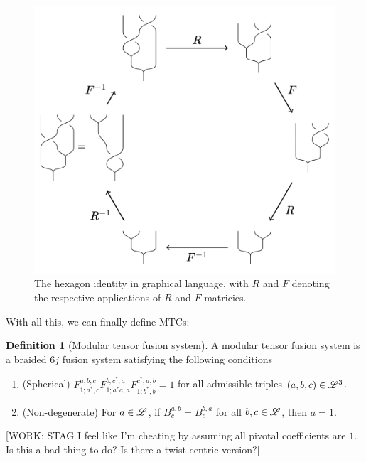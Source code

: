 \documentclass{article}
\theoremstyle{definition}
\newtheorem*{definition}{Definition}
\numberwithin{figure}{section}
\begin{document}
\begin{figure}
\begin{center}
\includegraphics[scale=0.25]{hexagon}
\caption{ The hexagon identity in graphical language, with $R$ and $F$ denoting the respective applications of $R$ and $F$ matricies.}
\label{fig:hexagon}
\end{center}
\end{figure}

With all this, we can finally define MTCs:

\begin{definition}[Modular tensor fusion system] A modular tensor fusion system is a braided $6j$ fusion system satisfying the following conditions

\begin{enumerate}

\item (Spherical) $F^{a,b,c}_{1;a^*,c}F^{b,c^*,a}_{1;a^*a,a}F^{c^*,a,b}_{1;b^*,b}=1$ for all admissible triples $(a,b,c)\in \mathscr{L}^3$.

\item (Non-degenerate) For $a\in \mathscr{L}$, if $B_c^{a,b}=B_c^{b,a}$ for all $b,c\in \mathscr{L}$, then $a=1$.
\end{enumerate}

[WORK: STAG I feel like I'm cheating by assuming all pivotal coefficients are $1$. Is this a bad thing to do? Is there a twist-centric version?]

\raggedleft\qedsymbol{}
\end{definition}
\end{document}
